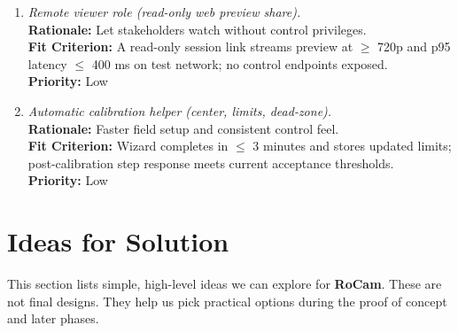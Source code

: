 \documentclass[12pt]{article}
\begin{document}
\begin{enumerate}[label=WTRM \arabic*., wide=0pt, leftmargin=*]
  \item \emph{Remote viewer role (read-only web preview share).}\\[2mm]
  \textbf{Rationale:} Let stakeholders watch without control privileges.\\
  \textbf{Fit Criterion:} A read-only session link streams preview at $\geq$ 720p and p95 latency $\leq$ 400 ms on test network; no control endpoints exposed.\\
  \textbf{Priority:} Low

  \item \emph{Automatic calibration helper (center, limits, dead-zone).}\\[2mm]
  \textbf{Rationale:} Faster field setup and consistent control feel.\\
  \textbf{Fit Criterion:} Wizard completes in $\leq$ 3 minutes and stores updated limits; post-calibration step response meets current acceptance thresholds.\\
  \textbf{Priority:} Low

\end{enumerate}

\section{Ideas for Solution}
\label{sec:ideas-for-solution}

This section lists simple, high-level ideas we can explore for \textbf{RoCam}. These are not final designs. They help us pick practical options during the proof of concept and later phases.
\end{document}
